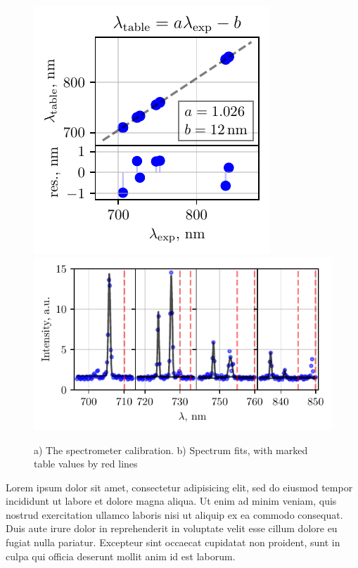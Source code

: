 \begin{figure}[h]
    \centering
    \includegraphics{../labs/2/calibration_linear_fit.pdf}
    \hspace{5 mm} 
    \includegraphics{../labs/2/calibration_gaussian_fits.pdf}
    \caption{a) The spectrometer calibration. b) Spectrum fits, with marked table values by red lines}
\end{figure}
Lorem ipsum dolor sit amet, consectetur adipisicing elit, sed do eiusmod
tempor incididunt ut labore et dolore magna aliqua. Ut enim ad minim veniam,
quis nostrud exercitation ullamco laboris nisi ut aliquip ex ea commodo
consequat. Duis aute irure dolor in reprehenderit in voluptate velit esse
cillum dolore eu fugiat nulla pariatur. Excepteur sint occaecat cupidatat non
proident, sunt in culpa qui officia deserunt mollit anim id est laborum.

\newpage

